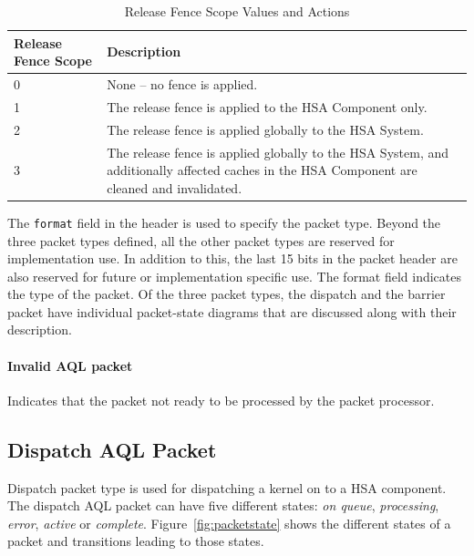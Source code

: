 \begin{table}
  \begin{center}
          \begin{tabular}{|p{1in}|p{5in}|}
      \hline
      \textbf{Release Fence Scope} &\textbf{Description} \\ 
      \hline
      0	& None – no fence is applied. \\
      \hline
      1	& The release fence is applied to the HSA Component only. \\
      \hline
      2	& The release fence is applied globally to the HSA System.\\
      \hline
      3	& The release fence is applied globally to the HSA System,
      and additionally affected caches in the HSA Component are
      cleaned and invalidated.\\
      \hline
    \end{tabular}
  \end{center}
  \caption{Release Fence Scope Values and Actions}
  \label{releasefencescope}
\end{table}

The \texttt{format} field in the header is used to specify
the packet type. Beyond the three packet types defined, all the
other packet types are reserved for implementation use. In addition
to this, the last 15 bits in the packet header are also reserved for
future or implementation specific use. The format field indicates
the type of the packet. Of the three packet types, the
dispatch and the barrier packet have individual packet-state
diagrams that are discussed along with their description.

\paragraph{Invalid AQL packet} Indicates that the packet not ready
to be processed by the packet processor. 

\hypertarget{dispatch_packet}{}\subsection{Dispatch AQL
Packet}\label{dispatch_packet}

Dispatch packet type is used for dispatching a kernel on to a HSA
component.  The dispatch AQL packet can have five different states:
\emph{on queue}, \emph{processing}, \emph{error}, \emph{active} or
\emph{complete}. Figure~\ref{fig:packetstate} shows the different
states of a packet and transitions leading to those states.

